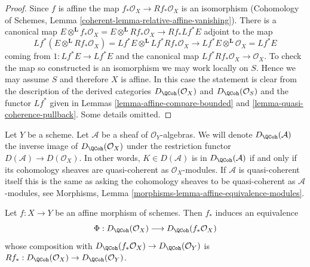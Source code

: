 \begin{proof}
Since $f$ is affine the map $f_*\mathcal{O}_X \to Rf_*\mathcal{O}_X$
is an isomorphism
(Cohomology of Schemes, Lemma \ref{coherent-lemma-relative-affine-vanishing}).
There is a canonical map $E \otimes^\mathbf{L} f_*\mathcal{O}_X =
E \otimes^\mathbf{L} Rf_*\mathcal{O}_X \to Rf_* Lf^* E$
adjoint to the map
$$
Lf^*(E \otimes^\mathbf{L} Rf_*\mathcal{O}_X) =
Lf^*E \otimes^\mathbf{L} Lf^*Rf_*\mathcal{O}_X \longrightarrow
Lf^* E \otimes^\mathbf{L} \mathcal{O}_X = Lf^* E
$$
coming from $1 : Lf^*E \to Lf^*E$ and the canonical map
$Lf^*Rf_*\mathcal{O}_X \to \mathcal{O}_X$. To check the map so constructed
is an isomorphism we may work locally on $S$. Hence we may assume
$S$ and therefore $X$ is affine. In this case the statement is clear from
the description of the derived categories
$D_\QCoh(\mathcal{O}_X)$ and
$D_\QCoh(\mathcal{O}_S)$ and the functor $Lf^*$ given in
Lemmas \ref{lemma-affine-compare-bounded} and
\ref{lemma-quasi-coherence-pullback}.
Some details omitted.
\end{proof}

\noindent
Let $Y$ be a scheme. Let $\mathcal{A}$ be a sheaf of $\mathcal{O}_Y$-algebras.
We will denote $D_\QCoh(\mathcal{A})$ the inverse image of
$D_\QCoh(\mathcal{O}_X)$ under the restriction functor
$D(\mathcal{A}) \to D(\mathcal{O}_X)$. In other words, $K \in D(\mathcal{A})$
is in $D_\QCoh(\mathcal{A})$ if and only if its cohomology sheaves are
quasi-coherent as $\mathcal{O}_X$-modules. If $\mathcal{A}$ is quasi-coherent
itself this is the same as asking the cohomology sheaves to be quasi-coherent
as $\mathcal{A}$-modules, see
Morphisms, Lemma \ref{morphisms-lemma-affine-equivalence-modules}.

\begin{lemma}
\label{lemma-affine-morphism-equivalence}
Let $f : X \to Y$ be an affine morphism of schemes. Then $f_*$ induces
an equivalence
$$
\Phi : D_\QCoh(\mathcal{O}_X) \longrightarrow D_\QCoh(f_*\mathcal{O}_X)
$$
whose composition with $D_\QCoh(f_*\mathcal{O}_X) \to D_\QCoh(\mathcal{O}_Y)$
is $Rf_* : D_\QCoh(\mathcal{O}_X) \to D_\QCoh(\mathcal{O}_Y)$.
\end{lemma}

